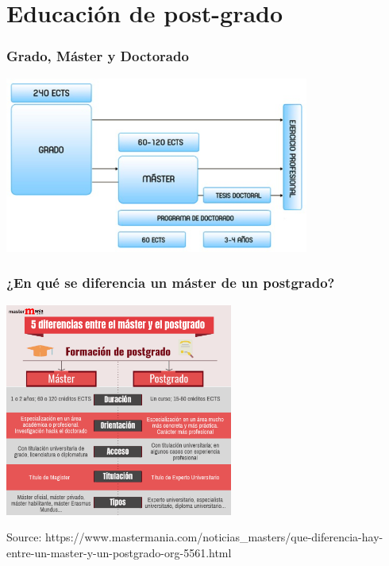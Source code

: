 \section{Educación de post-grado}


\begin{frame}
\frametitle{Grado, Máster y Doctorado}


\begin{center}
  \includegraphics[width=10cm]{figs/post-grado.png}
\end{center}

\end{frame}


\begin{frame}
\frametitle{¿En qué se diferencia un máster de un postgrado?}


\begin{center}
  \includegraphics[width=7.5cm]{figs/diferencias_masterypostgrado.png}
\end{center}

\vspace{-0.8cm}
\begin{flushright}
{\tiny
Source: https://www.mastermania.com/noticias\_masters/que-diferencia-hay-entre-un-master-y-un-postgrado-org-5561.html
}
\end{flushright}

\end{frame}


